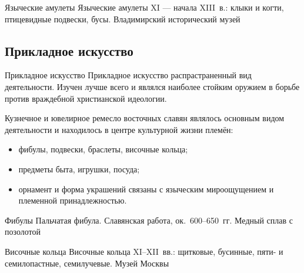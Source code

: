 \begin{frame}{Языческие амулеты}
    {Языческие амулеты XI --- начала XIII~в.:
     клыки и когти, птицевидные подвески, бусы.
     Владимирский исторический музей}
\end{frame}

\subsection{Прикладное искусство}

\begin{frame}{Прикладное искусство}
  Прикладное искусство распрастраненный вид деятельности. Изучен лучше всего и являлся наиболее стойким оружием в борьбе против враждебной христианской идеологии. 
  
  Кузнечное и ювелирное ремесло восточных славян являлось основным видом деятельности и находилось в центре культурной жизни племён:
  \begin{itemize}
    \item фибулы, подвески, браслеты, височные кольца;
    \item предметы быта, игрушки, посуда;
    \item орнамент и форма украшений связаны с языческим мироощущением
          и племенной принадлежностью.
  \end{itemize}
\end{frame}

\begin{frame}{Фибулы}
    {Пальчатая фибула. Славянская работа,
     ок.\ 600--650~гг. Медный сплав с позолотой}
\end{frame}

\begin{frame}{Височные кольца}
    {Височные кольца XI--XII~вв.: щитковые, бусинные,
     пяти- и семилопастные, семилучевые. Музей Москвы}
\end{frame}

